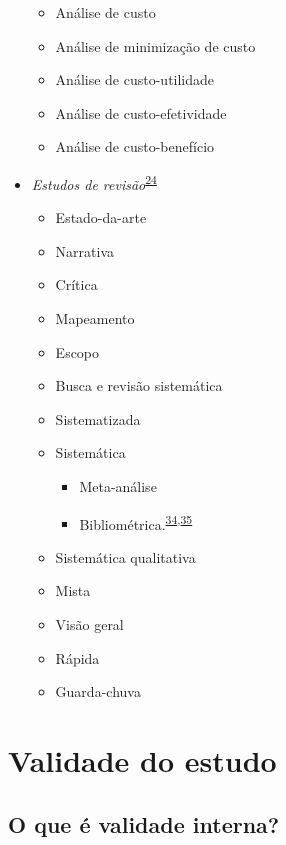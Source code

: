 \documentclass[
  a4paper,
]{book}
\begin{document}
\begin{itemize}
  \begin{itemize}
  \item
    Análise de custo
  \item
    Análise de minimização de custo
  \item
    Análise de custo-utilidade
  \item
    Análise de custo-efetividade
  \item
    Análise de custo-benefício
  \end{itemize}
\item
  \emph{Estudos de revisão}\textsuperscript{\protect\hyperlink{ref-Grant2009}{24}}

  \begin{itemize}
  \item
    Estado-da-arte
  \item
    Narrativa
  \item
    Crítica
  \item
    Mapeamento
  \item
    Escopo
  \item
    Busca e revisão sistemática
  \item
    Sistematizada
  \item
    Sistemática

    \begin{itemize}
    \item
      Meta-análise
    \item
      Bibliométrica.\textsuperscript{\protect\hyperlink{ref-donthu2021}{34},\protect\hyperlink{ref-lim2023}{35}}
    \end{itemize}
  \item
    Sistemática qualitativa
  \item
    Mista
  \item
    Visão geral
  \item
    Rápida
  \item
    Guarda-chuva
  \end{itemize}
\end{itemize}

\hypertarget{validade-estudo}{%
\section{Validade do estudo}\label{validade-estudo}}

\hypertarget{o-que-uxe9-validade-interna}{%
\subsection{O que é validade interna?}\label{o-que-uxe9-validade-interna}}
\end{document}
